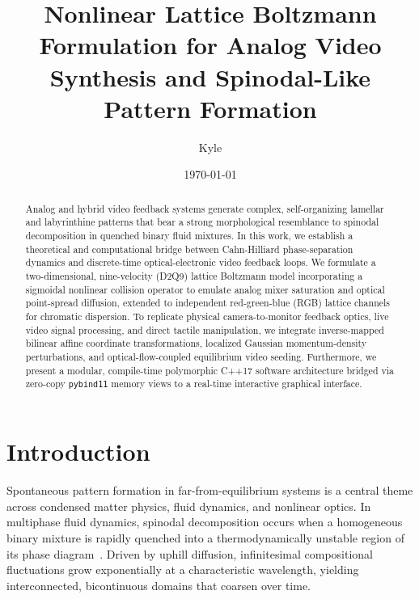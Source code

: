 \documentclass[aps,pre,twocolumn,showpacs,superscriptaddress,floatfix]{revtex4-2}
\begin{document}
\title{Nonlinear Lattice Boltzmann Formulation for Analog Video Synthesis and Spinodal-Like Pattern Formation}

\author{Kyle}

\date{\today}

\begin{abstract}
Analog and hybrid video feedback systems generate complex, self-organizing lamellar and labyrinthine patterns that bear a strong morphological resemblance to spinodal decomposition in quenched binary fluid mixtures. In this work, we establish a theoretical and computational bridge between Cahn-Hilliard phase-separation dynamics and discrete-time optical-electronic video feedback loops. We formulate a two-dimensional, nine-velocity (D2Q9) lattice Boltzmann model incorporating a sigmoidal nonlinear collision operator to emulate analog mixer saturation and optical point-spread diffusion, extended to independent red-green-blue (RGB) lattice channels for chromatic dispersion. To replicate physical camera-to-monitor feedback optics, live video signal processing, and direct tactile manipulation, we integrate inverse-mapped bilinear affine coordinate transformations, localized Gaussian momentum-density perturbations, and optical-flow-coupled equilibrium video seeding. Furthermore, we present a modular, compile-time polymorphic C++17 software architecture bridged via zero-copy \texttt{pybind11} memory views to a real-time interactive graphical interface.
\end{abstract}

\maketitle

\section{Introduction}

Spontaneous pattern formation in far-from-equilibrium systems is a central theme across condensed matter physics, fluid dynamics, and nonlinear optics. In multiphase fluid dynamics, spinodal decomposition occurs when a homogeneous binary mixture is rapidly quenched into a thermodynamically unstable region of its phase diagram~\cite{cahn1958}. Driven by uphill diffusion, infinitesimal compositional fluctuations grow exponentially at a characteristic wavelength, yielding interconnected, bicontinuous domains that coarsen over time.
\end{document}
